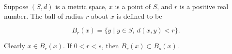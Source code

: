 Suppose $(S, d)$ is a metric space, $x$ is a point of $S$, and $r$ is a positive real number. The ball of radius $r$ about $x$ is defined to be

$$B_r(x) = \{ y \mid y \in S,\ d(x, y) < r \}.$$

Clearly $x \in B_r(x)$. If $0 < r < s$, then $B_r(x) \subset B_s(x)$.
